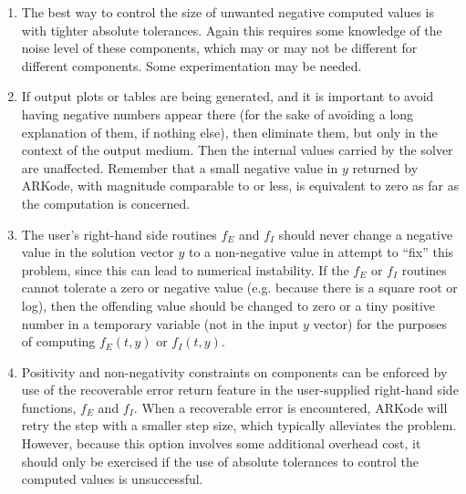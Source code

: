 \documentclass[letterpaper,10pt,english]{sphinxmanual}
\begin{document}
\begin{enumerate}
\item {} 
The best way to control the size of unwanted negative computed
values is with tighter absolute tolerances.  Again this requires
some knowledge of the noise level of these components, which may
or may not be different for different components. Some
experimentation may be needed.

\item {} 
If output plots or tables are being generated, and it is important
to avoid having negative numbers appear there (for the sake of
avoiding a long explanation of them, if nothing else), then
eliminate them, but only in the context of the output medium. Then
the internal values carried by the solver are unaffected. Remember
that a small negative value in \(y\) returned by ARKode, with
magnitude comparable to  or less, is equivalent to zero
as far as the computation is concerned.

\item {} 
The user's right-hand side routines \(f_E\) and \(f_I\)
should never change a negative value in the solution vector \(y\)
to a non-negative value in attempt to ``fix'' this problem,
since this can lead to numerical instability.  If the \(f_E\)
or \(f_I\) routines cannot tolerate a zero or negative value
(e.g. because there is a square root or log), then the offending
value should be changed to zero or a tiny positive number in a
temporary variable (not in the input \(y\) vector) for the
purposes of computing \(f_E(t, y)\) or \(f_I(t, y)\).

\item {} 
Positivity and non-negativity constraints on components can be
enforced by use of the recoverable error return feature in the
user-supplied right-hand side functions, \(f_E\) and
\(f_I\). When a recoverable error is encountered, ARKode will
retry the step with a smaller step size, which typically
alleviates the problem.  However, because this option involves
some additional overhead cost, it should only be exercised if the
use of absolute tolerances to control the computed values is
unsuccessful.

\end{enumerate}
\end{document}
